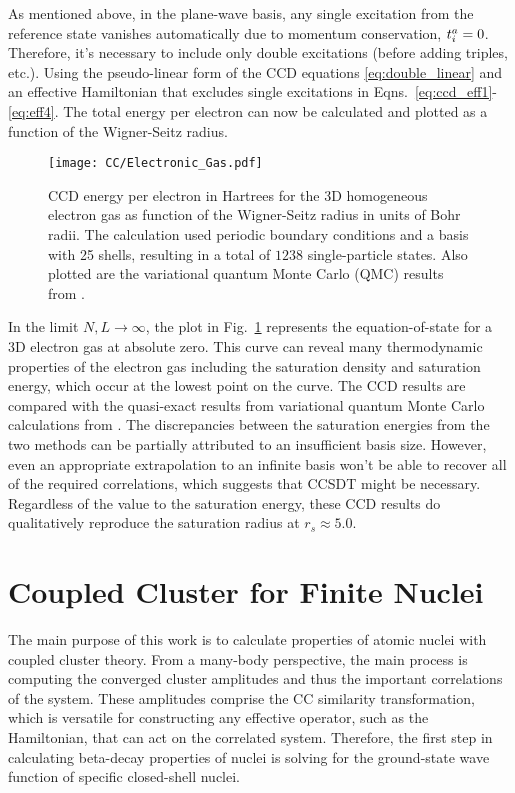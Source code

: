 \documentclass[thesis.tex]{subfiles}
\begin{document}
As mentioned above, in the plane-wave basis, any single excitation from the reference state vanishes automatically due to momentum conservation, $t^{a}_{i} = 0$.  Therefore, it's necessary to include only double excitations (before adding triples, etc.).  Using the pseudo-linear form of the CCD equations \eqref{eq:double_linear} and an effective Hamiltonian that excludes single excitations in Eqns.\ \eqref{eq:ccd_eff1}-\eqref{eq:eff4}.  The total energy per electron can now be calculated and plotted as a function of the Wigner-Seitz radius.
\begin{figure}[h]
  \texttt{[image: CC/Electronic\_Gas.pdf]}
  \caption{CCD energy per electron in Hartrees for the 3D homogeneous electron gas as function of the Wigner-Seitz radius in units of Bohr radii. The calculation used periodic boundary conditions and a basis with 25 shells, resulting in a total of $1238$ single-particle states. Also plotted are the variational quantum Monte Carlo (QMC) results from \cite{LOPEZ2006}.}  
  \label{fig:Electronic_Gas}
\end{figure}
In the limit $N,L \rightarrow \infty$, the plot in Fig.\ \ref{fig:Electronic_Gas} represents the equation-of-state for a 3D electron gas at absolute zero.  This curve can reveal many thermodynamic properties of the electron gas including the saturation density and saturation energy, which occur at the lowest point on the curve.  The CCD results are compared with the quasi-exact results from variational quantum Monte Carlo calculations from \cite{LOPEZ2006}.  The discrepancies between the saturation energies from the two methods can be partially attributed to an insufficient basis size.  However, even an appropriate extrapolation to an infinite basis won't be able to recover all of the required correlations, which suggests that CCSDT might be necessary.  Regardless of the value to the saturation energy, these CCD results do qualitatively reproduce the saturation radius at $r_{s} \approx 5.0$.



\section{Coupled Cluster for Finite Nuclei} \label{section:cc_nuclei}

The main purpose of this work is to calculate properties of atomic nuclei with coupled cluster theory.  From a many-body perspective, the main process is computing the converged cluster amplitudes and thus the important correlations of the system.  These amplitudes comprise the CC similarity transformation, which is versatile for constructing any effective operator, such as the Hamiltonian, that can act on the correlated system.  Therefore, the first step in calculating beta-decay properties of nuclei is solving for the ground-state wave function of specific closed-shell nuclei.
\end{document}
